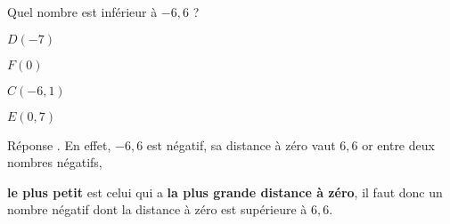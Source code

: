 \begin{exercice}
    Quel nombre est inférieur à $-6,6$ ?
    \begin{ChoixQCM}{4}
        \item $D(-7)$
        \item $F(0)$
        \item $C(-6,1)$
        \item $E(0,7)$
    \end{ChoixQCM}
\end{exercice}
\begin{corrige}
    Réponse . En effet, $-6,6$ est négatif, sa distance à zéro vaut $6,6$ or entre deux nombres négatifs,

    \textbf{le plus petit} est celui qui a \textbf{la plus grande distance à zéro},
    il faut donc un nombre négatif dont la distance à zéro est supérieure à $6,6$.    
\end{corrige}